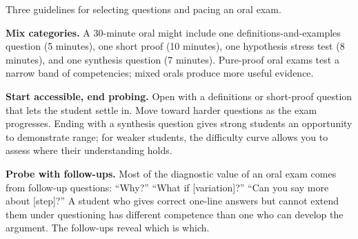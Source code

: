 \documentclass[11pt]{book}
\begin{document}
Three guidelines for selecting questions and pacing an oral exam.

\textbf{Mix categories.} A 30-minute oral might include one definitions-and-examples question (5 minutes), one short proof (10 minutes), one hypothesis stress test (8 minutes), and one synthesis question (7 minutes). Pure-proof oral exams test a narrow band of competencies; mixed orals produce more useful evidence.

\textbf{Start accessible, end probing.} Open with a definitions or short-proof question that lets the student settle in. Move toward harder questions as the exam progresses. Ending with a synthesis question gives strong students an opportunity to demonstrate range; for weaker students, the difficulty curve allows you to assess where their understanding holds.

\textbf{Probe with follow-ups.} Most of the diagnostic value of an oral exam comes from follow-up questions: ``Why?'' ``What if [variation]?'' ``Can you say more about [step]?'' A student who gives correct one-line answers but cannot extend them under questioning has different competence than one who can develop the argument. The follow-ups reveal which is which.
\end{document}
